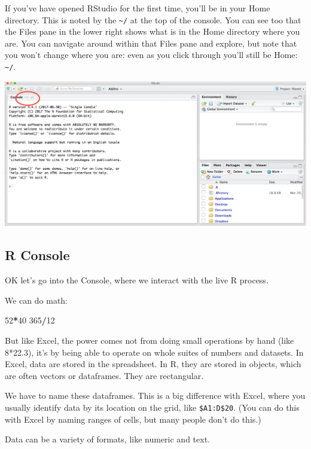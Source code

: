 \documentclass[]{book}
\newenvironment{Shaded}{\begin{snugshade}}{\end{snugshade}}
\newcommand{\DecValTok}[1]{\textcolor[rgb]{0.00,0.00,0.81}{#1}}
\newcommand{\OperatorTok}[1]{\textcolor[rgb]{0.81,0.36,0.00}{\textbf{#1}}}
\begin{document}
If you've have opened RStudio for the first time, you'll be in your Home directory. This is noted by the \texttt{\textasciitilde{}/} at the top of the console. You can see too that the Files pane in the lower right shows what is in the Home directory where you are. You can navigate around within that Files pane and explore, but note that you won't change where you are: even as you click through you'll still be Home: \texttt{\textasciitilde{}/}.

\includegraphics[width=0.8\linewidth]{img/RStudio_IDE_homedir}

\hypertarget{r-console}{%
\subsection{R Console}\label{r-console}}

OK let's go into the Console, where we interact with the live R process.

We can do math:

\begin{Shaded}
\begin{Highlighting}[]
\DecValTok{52}\OperatorTok{*}\DecValTok{40}
\DecValTok{365}\OperatorTok{/}\DecValTok{12}
\end{Highlighting}
\end{Shaded}

But like Excel, the power comes not from doing small operations by hand (like 8*22.3), it's by being able to operate on whole suites of numbers and datasets. In Excel, data are stored in the spreadsheet. In R, they are stored in objects, which are often vectors or dataframes. They are rectangular.

We have to name these dataframes. This is a big difference with Excel, where you usually identify data by its location on the grid, like \texttt{\$A1:D\$20}. (You can do this with Excel by naming ranges of cells, but many people don't do this.)

Data can be a variety of formats, like numeric and text.
\end{document}
